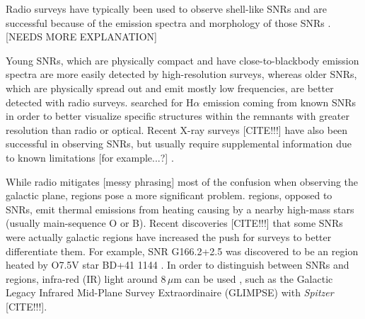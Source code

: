 \documentclass[12pt,preprint]{emulateapj}
\begin{document}
Radio surveys have typically been used to observe shell-like SNRs and are successful because of the emission spectra and morphology of those SNRs \citep{bandiera01}.  {\color{red}[NEEDS MORE EXPLANATION]}

Young SNRs, which are physically compact and have close-to-blackbody emission spectra are more easily detected by high-resolution surveys, whereas older SNRs, which are physically spread out and emit mostly low frequencies, are better detected with radio surveys. \citet{stupar11} searched for H$\alpha$ emission coming from known SNRs in order to better visualize specific structures within the remnants with greater resolution than radio or optical.  Recent X-ray surveys {\color{red}[CITE!!!]} have also been successful in observing SNRs, but usually require supplemental information due to known limitations {\color{red}[for example...?]} \citep{bandiera01}. 

While radio mitigates {\color{red}[messy phrasing]} most of the confusion when observing the galactic plane,  regions pose a more significant problem.   regions, opposed to SNRs, emit thermal emissions from heating causing by a nearby high-mass stars (usually main-sequence O or B).  Recent discoveries {\color{red}[CITE!!!]} that some SNRs were actually galactic  regions have increased the push for surveys to better differentiate them.  For example, SNR G166.2+2.5 was discovered to be an  region heated by O7.5V star BD+41 1144 \citep{foster06}.  In order to distinguish between SNRs and  regions, infra-red (IR) light around 8\,$\mu$m can be used \citep{price01}, such as the Galactic Legacy Infrared Mid-Plane Survey Extraordinaire (GLIMPSE) with \textit{Spitzer} {\color{red}[CITE!!!]}.  
\end{document}

